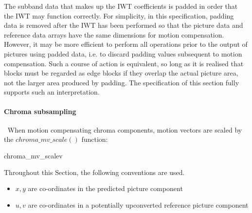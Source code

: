 \begin{informative}
The subband data that makes up the IWT coefficients is padded in order that the IWT
may function correctly. For simplicity, in this specification, padding data is removed
after the IWT has been performed so that the picture data and reference data arrays have
the same dimensions for motion compensation. However, it may be more efficient to perform
all operations prior to the output of pictures using padded data, i.e. to discard padding values
subsequent to motion compensation. Such a course of action is equivalent, so long as it is realised
that blocks must be regarded as edge blocks if they overlap the actual picture area, not the
larger area produced by padding. The specification of this section fully supports such an 
interpretation.
\end{informative}

\paragraph{Chroma subsampling}
\label{chromamvscale}
$\ $\newline
When motion compensating chroma components, motion vectors are scaled by the
$chroma\_mv\_scale()$ function:

\begin{pseudo}{chroma\_mv\_scale}{v}
\end{pseudo}

Throughout this Section, the following conventions are used.

\begin{itemize}
\item $x,y$ are co-ordinates in the predicted picture component
\item $u,v$ are co-ordinates in a potentially upconverted reference picture component
\end{itemize}

\begin{comment}
[Are they??]
\end{comment}

